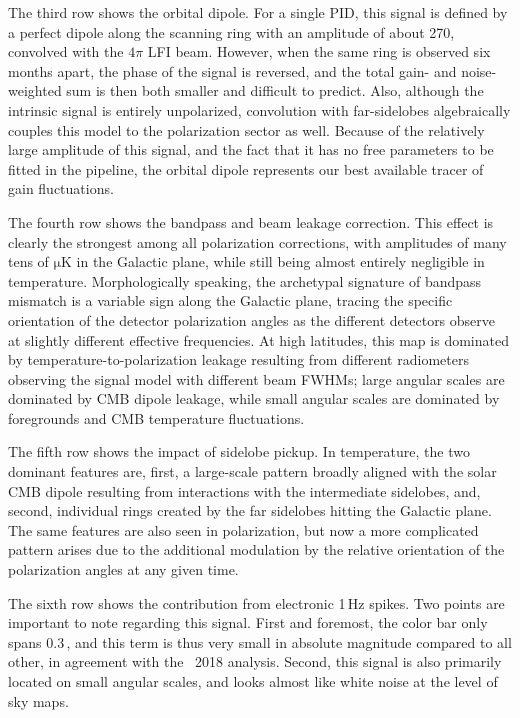 \documentclass[twocolumn]{aa}
\begin{document}
The third row shows the orbital dipole. For a single PID, this signal
is defined by a perfect dipole along the scanning ring with an
amplitude of about 270\muK, convolved with the $4\pi$ LFI
beam. However, when the same ring is observed six months apart, the
phase of the signal is reversed, and the total gain- and
noise-weighted sum is then both smaller and difficult to
predict. Also, although the intrinsic signal is entirely unpolarized,
convolution with far-sidelobes algebraically couples this model to the
polarization sector as well. Because of the relatively large amplitude
of this signal, and the fact that it has no free parameters to be
fitted in the pipeline, the orbital dipole represents our best
available tracer of gain fluctuations.

The fourth row shows the bandpass and beam leakage correction. This
effect is clearly the strongest among all polarization corrections,
with amplitudes of many tens of $\mathrm{\mu K}$ in the
Galactic plane, while still being almost entirely negligible in
temperature. Morphologically speaking, the archetypal signature of
bandpass mismatch is a variable sign along the Galactic plane, tracing
the specific orientation of the detector polarization angles as the
different detectors observe at slightly different effective
frequencies. At high latitudes, this map is dominated by
temperature-to-polarization leakage resulting from different
radiometers observing the signal model with different beam FWHMs;
large angular scales are dominated by CMB dipole leakage, while small
angular scales are dominated by foregrounds and CMB temperature
fluctuations.

The fifth row shows the impact of sidelobe pickup. In temperature, the
two dominant features are, first, a large-scale pattern broadly
aligned with the solar CMB dipole resulting from interactions with the
intermediate sidelobes, and, second, individual rings created by the
far sidelobes hitting the Galactic plane. The same features are also
seen in polarization, but now a more complicated pattern arises due to
the additional modulation by the relative orientation of the
polarization angles at any given time.

The sixth row shows the contribution from electronic 1\,Hz spikes. Two
points are important to note regarding this signal. First and
foremost, the color bar only spans 0.3\,\muK, and this term is thus
very small in absolute magnitude compared to all other, 
in agreement with the \Planck\ 2018 analysis. Second, this 
signal is also primarily located on small
angular scales, and looks almost like white noise at the level of sky
maps.
\end{document}
